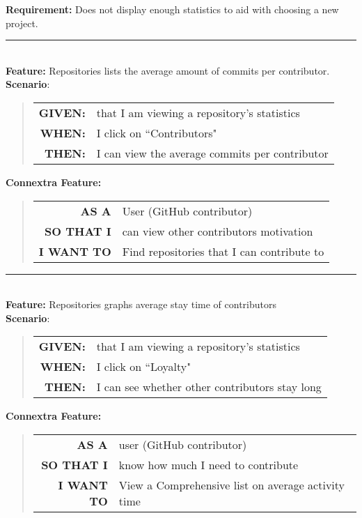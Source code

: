 \documentclass[12pt]{article}
\newcommand{\Requirement}[1] {
   \noindent \textbf{Requirement:} #1
}
\newcommand{\Feature}[1]{ 
   \noindent \textbf{Feature:} #1
}
\newcommand{\CFeature}[4]{
\noindent \textbf{Connextra Feature:}
	\begin{quote}
	\begin{tabular}{rl}
	\textbf{AS A} & #1\\
	\textbf{SO THAT \uppercase{#2}} & #3\\
	\textbf{\uppercase{#2} WANT TO} & #4  
	\end{tabular}
	\end{quote}
}
\newcommand{\GivenSc} {
	\noindent \textbf{GIVEN:}
	}
\newcommand{\WhenSc} {
	\noindent \textbf{WHEN:}
	}
\newcommand{\AndSc} {
	\noindent \textbf{AND:}
	}
\newcommand{\ThenSc} {
	\noindent \textbf{THEN:}
	}
\begin{document}
\begin{framed}
\Requirement{Does not display enough statistics to aid with choosing a new project.}\\[0.2cm]

\hrule~\\

\Feature{Repositories lists the average amount of commits per contributor.}\\[0.2cm]

\noindent \textbf{Scenario}:
\begin{quote}
\begin{tabular}{rl}
\GivenSc & that I am viewing a repository's statistics\\
\WhenSc & I click on ``Contributors"\\
\ThenSc & I can view the average commits per contributor
\end{tabular}
\end{quote}

\CFeature{User (\textsf{GitHub} contributor)}{I}{can view other contributors motivation}{Find repositories that I can contribute to}

\hrule~\\

\Feature{Repositories graphs average stay time of contributors}\\[0.4cm]

\noindent \textbf{Scenario}:
\begin{quote}
\begin{tabular}{rl}
\GivenSc & that I am viewing a repository's statistics\\
\WhenSc & I click on ``Loyalty"\\
\ThenSc & I can see whether other contributors stay long
\end{tabular}
\end{quote}

\CFeature{user (\textsf{GitHub} contributor)}{I}{know how much I need to contribute}{View a Comprehensive list on average activity time}
\
\end{framed}
\end{document}
